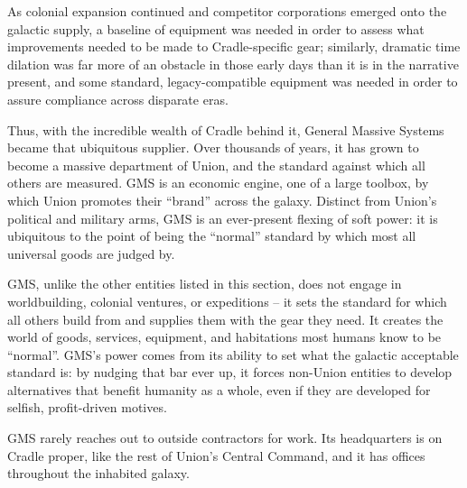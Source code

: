 As colonial expansion continued and competitor corporations emerged onto the galactic supply, a
baseline of equipment was needed in order to assess what improvements needed to be made to
Cradle-specific gear; similarly, dramatic time dilation was far more of an obstacle in those early
days than it is in the narrative present, and some standard, legacy-compatible equipment was
needed in order to assure compliance across disparate eras.

Thus, with the incredible wealth of Cradle behind it, General Massive Systems became that
ubiquitous supplier. Over thousands of years, it has grown to become a massive department of
Union, and the standard against which all others are measured. GMS is an economic engine, one
of a large toolbox, by which Union promotes their “brand” across the galaxy. Distinct from Union’s
political and military arms, GMS is an ever-present flexing of soft power: it is ubiquitous to the
point of being the “normal” standard by which most all universal goods are judged by.

GMS, unlike the other entities listed in this section, does not engage in worldbuilding, colonial
ventures, or expeditions -- it sets the standard for which all others build from and supplies them
with the gear they need. It creates the world of goods, services, equipment, and habitations most
humans know to be “normal”. GMS’s power comes from its ability to set what the galactic
acceptable standard is: by nudging that bar ever up, it forces non-Union entities to develop
alternatives that benefit humanity as a whole, even if they are developed for selfish, profit-driven
motives.

GMS rarely reaches out to outside contractors for work. Its headquarters is on Cradle proper, like
the rest of Union’s Central Command, and it has offices throughout the inhabited galaxy.

